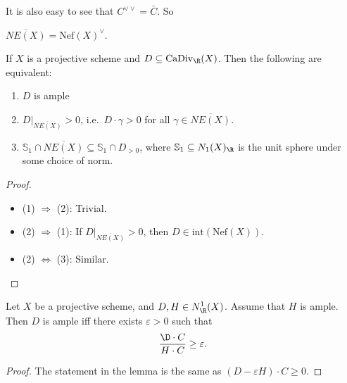 \documentclass[a4paper]{article}
\newcommand\CaDiv{\mathrm{CaDiv}}
\newcommand\Nef{\mathrm{Nef}}
\begin{document}
It is also easy to see that $C^{\vee \vee} = \bar{C}$. So

\begin{prop}
  $\overline{NE(X)} = \Nef(X)^\vee$.\fakeqed
\end{prop}

\begin{thm}
  If $X$ is a projective scheme and $D \subseteq \CaDiv_\R(X)$. Then the following are equivalent:
  \begin{enumerate}
    \item $D$ is ample
    \item $D|_{\overline{NE(X)}} > 0$, i.e.\ $D \cdot \gamma > 0$ for all $\gamma \in \overline{NE(X)}$.
    \item $\mathbb{S}_1 \cap \overline{NE(X)} \subseteq \mathbb{S}_1 \cap D_{>0}$, where $\mathbb{S}_1 \subseteq N_1(X)_\R$ is the unit sphere under some choice of norm.
  \end{enumerate}
\end{thm}

\begin{proof}\leavevmode
  \begin{itemize}
    \item (1) $\Rightarrow$ (2): Trivial.
    \item (2) $\Rightarrow$ (1): If $D|_{\overline{NE(X)}} > 0$, then $D \in \mathrm{int} (\Nef(X))$.
    \item (2) $\Leftrightarrow$ (3): Similar.\qedhere
  \end{itemize}
\end{proof}

\begin{prop}
  Let $X$ be a projective scheme, and $D, H \in N^1_\R(X)$. Assume that $H$ is ample. Then $D$ is ample iff there exists $\varepsilon > 0$ such that
  \[
    \frac{\D \cdot C}{H \cdot C} \geq \varepsilon.
  \]
\end{prop}

\begin{proof}
  The statement in the lemma is the same as $(D - \varepsilon H) \cdot C \geq 0$.
\end{proof}
\end{document}
